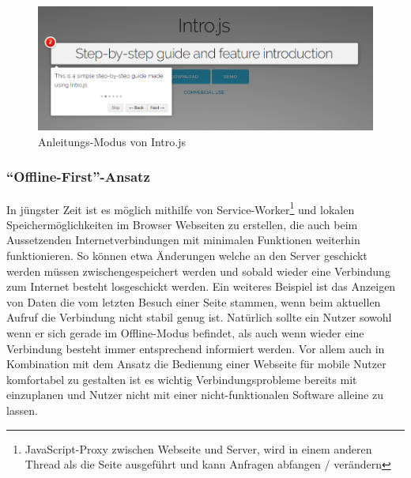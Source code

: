  \begin{figure}
    \centering
    \captionsetup{justification=centering}
    \includegraphics[width=\textwidth]{figures/intro_js_example.png}
        \caption{Anleitungs-Modus von Intro.js \parencite{mehrabani}}\label{fig:intro_js_example}
\end{figure}

\subsubsection{``Offline-First''-Ansatz}
In jüngster Zeit ist es möglich mithilfe von Service-Worker\footnote{JavaScript-Proxy zwischen Webseite und Server, wird in einem anderen Thread als die Seite ausgeführt und kann Anfragen abfangen / verändern} und lokalen Speichermöglichkeiten im Browser Webseiten zu erstellen, die auch beim Aussetzenden Internetverbindungen mit minimalen Funktionen weiterhin funktionieren. So können etwa Änderungen welche an den Server geschickt werden müssen zwischengespeichert werden und sobald wieder eine Verbindung zum Internet besteht losgeschickt werden. Ein weiteres Beispiel ist das Anzeigen von Daten die vom letzten Besuch einer Seite stammen, wenn beim aktuellen Aufruf die Verbindung nicht stabil genug ist. Natürlich sollte ein Nutzer sowohl wenn er sich gerade im Offline-Modus befindet, als auch wenn wieder eine Verbindung besteht immer entsprechend informiert werden.
Vor allem auch in Kombination mit dem Ansatz die Bedienung einer Webseite für mobile Nutzer komfortabel zu gestalten ist es wichtig Verbindungsprobleme bereits mit einzuplanen und Nutzer nicht mit einer nicht-funktionalen Software alleine zu lassen.

